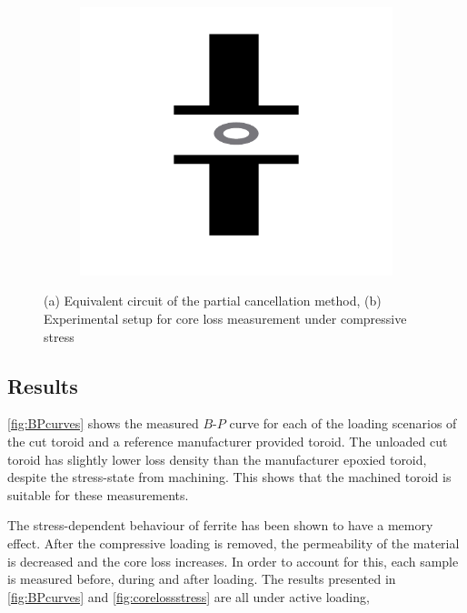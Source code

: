 \documentclass[conference]{IEEEtran}
\begin{document}
\begin{figure}[t]
  \begin{subfigure}{\columnwidth}
    \centering
    
    \caption{}
    \label{fig:partialcancellationcircuit}
  \end{subfigure}
  \begin{subfigure}{\columnwidth}
    \centering
    \includegraphics{figures/experimentalsetup.pdf}
    \caption{}
    \label{fig:experimentalsetup}
  \end{subfigure}
  \caption{(a) Equivalent circuit of the partial cancellation method, (b) Experimental setup for core loss measurement under compressive stress}
\end{figure}
\subsection{Results}

\cref{fig:BPcurves} shows the measured $B$-$P$ curve for each of the loading scenarios of the cut toroid and a reference manufacturer provided toroid. 
The unloaded cut toroid has slightly lower loss density than the manufacturer epoxied toroid, despite the stress-state from machining. 
This shows that the machined toroid is suitable for these measurements. 

The stress-dependent behaviour of ferrite has been shown to have a memory effect. 
After the compressive loading is removed, the permeability of the material is decreased and the core loss increases. 
In order to account for this, each sample is measured before, during and after loading. 
The results presented in \cref{fig:BPcurves} and \cref{fig:corelossstress} are all under active loading, 
\end{document}
